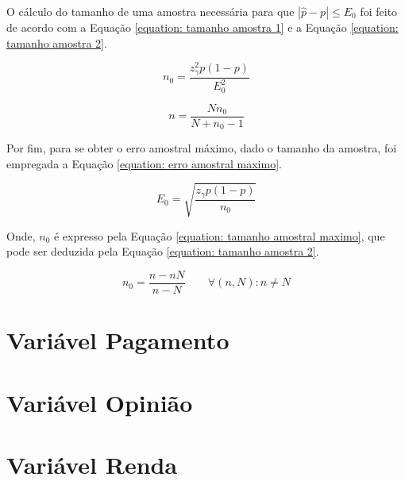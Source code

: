 \documentclass[10pt,a4paper,oneside]{article}
\begin{document}
	O cálculo do tamanho de uma amostra necessária para que $|\hat{p} - p|
	\leq E_0$ foi feito de acordo com a Equação \ref{equation: tamanho amostra
	1} e a Equação \ref{equation: tamanho amostra 2}.

	\begin{equation}
		n_0 = \frac{z_\gamma^2 p(1-p)}{E_0^2}
		\label{equation: tamanho amostra 1}
	\end{equation}

	\begin{equation}
		n = \frac{N n_0}{N + n_0 - 1}
		\label{equation: tamanho amostra 2}
	\end{equation}

	Por fim, para se obter o erro amostral máximo, dado o tamanho da
	amostra, foi empregada a Equação \ref{equation: erro amostral maximo}.
	
	\begin{equation}
		E_0 = \sqrt{\frac{z_\gamma p(1 - p) }{n_0}}
		\label{equation: erro amostral maximo}
	\end{equation}
	
	Onde, $n_0$ é expresso pela Equação	\ref{equation: tamanho amostral
	maximo}, que pode ser deduzida pela Equação \ref{equation: tamanho
	amostra 2}.

	\begin{equation}
		n_0 = \frac{n-n N}{n-N} \qquad \forall (n, N) : n \neq N
	\label{equation: tamanho amostral maximo}
	\end{equation}

\section{Variável Pagamento}
\label{questao:4}


\section{Variável Opinião}
\label{questao:5}


\section{Variável Renda}
\label{questao:6}

\end{document}
